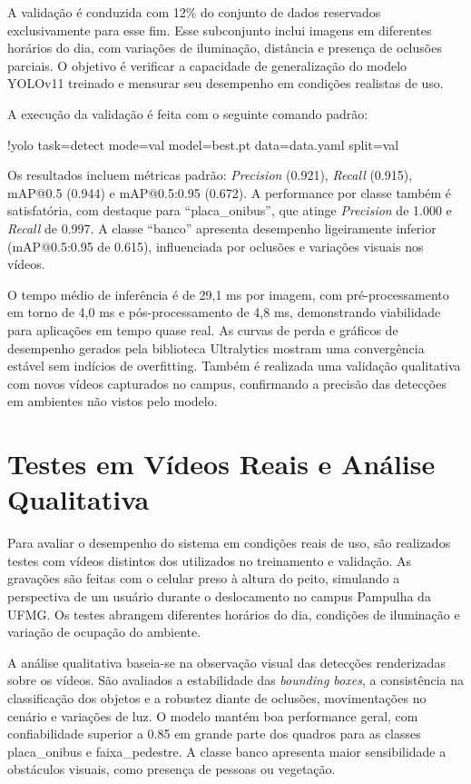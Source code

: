 A validação é conduzida com 12\% do conjunto de dados reservados exclusivamente para esse fim. Esse subconjunto inclui imagens em diferentes horários do dia, com variações de iluminação, distância e presença de oclusões parciais. O objetivo é verificar a capacidade de generalização do modelo YOLOv11 treinado e mensurar seu desempenho em condições realistas de uso.

A execução da validação é feita com o seguinte comando padrão:

!yolo task=detect mode=val model=best.pt data=data.yaml split=val

Os resultados incluem métricas padrão: \textit{Precision} (0.921), \textit{Recall} (0.915), mAP@0.5 (0.944) e mAP@0.5:0.95 (0.672). A performance por classe também é satisfatória, com destaque para “placa\_onibus”, que atinge \textit{Precision} de 1.000 e \textit{Recall} de 0.997. A classe “banco” apresenta desempenho ligeiramente inferior (mAP@0.5:0.95 de 0.615), influenciada por oclusões e variações visuais nos vídeos.

O tempo médio de inferência é de 29,1 ms por imagem, com pré-processamento em torno de 4,0 ms e pós-processamento de 4,8 ms, demonstrando viabilidade para aplicações em tempo quase real. As curvas de perda e gráficos de desempenho gerados pela biblioteca Ultralytics mostram uma convergência estável sem indícios de overfitting. Também é realizada uma validação qualitativa com novos vídeos capturados no campus, confirmando a precisão das detecções em ambientes não vistos pelo modelo.

\section{\textbf{Testes em Vídeos Reais e Análise Qualitativa}}

Para avaliar o desempenho do sistema em condições reais de uso, são realizados testes com vídeos distintos dos utilizados no treinamento e validação. As gravações são feitas com o celular preso à altura do peito, simulando a perspectiva de um usuário durante o deslocamento no campus Pampulha da UFMG. Os testes abrangem diferentes horários do dia, condições de iluminação e variação de ocupação do ambiente.

A análise qualitativa baseia-se na observação visual das detecções renderizadas sobre os vídeos. São avaliados a estabilidade das \textit{bounding boxes}, a consistência na classificação dos objetos e a robustez diante de oclusões, movimentações no cenário e variações de luz. O modelo mantém boa performance geral, com confiabilidade superior a 0.85 em grande parte dos quadros para as classes placa\_onibus e faixa\_pedestre. A classe banco apresenta maior sensibilidade a obstáculos visuais, como presença de pessoas ou vegetação.

